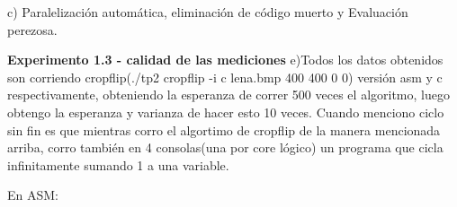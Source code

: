 \documentclass{article}
\begin{document}
c) Paralelización automática, eliminación de código muerto y Evaluación perezosa.


\newpage

\textbf{Experimento 1.3 - calidad de las mediciones}\newline
e)Todos los datos obtenidos son corriendo cropflip(./tp2 cropflip -i c lena.bmp 400 400 0 0) versión asm y c respectivamente, obteniendo la esperanza de correr 500 veces el algoritmo, luego obtengo la esperanza y varianza de hacer esto 10 veces.
\newline
Cuando menciono ciclo sin fin es que mientras corro el algortimo de cropflip de la manera mencionada arriba, corro también en 4 consolas(una por core lógico) un programa que cicla infinitamente sumando 1 a una variable.
\newline

En ASM: 
\newline
\end{document}
